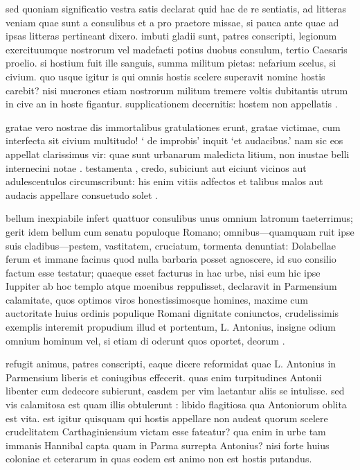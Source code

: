  sed quoniam significatio vestra satis declarat quid hac de re sentiatis, ad litteras veniam quae sunt a consulibus et a pro praetore missae, si pauca ante quae ad ipsas litteras pertineant dixero. imbuti gladii sunt, patres conscripti, legionum exercituumque nostrorum vel madefacti potius duobus consulum, tertio Caesaris proelio. si hostium fuit ille sanguis, summa militum pietas: nefarium scelus, si civium. quo usque igitur is qui omnis hostis scelere superavit nomine hostis carebit? nisi mucrones etiam nostrorum militum tremere voltis dubitantis utrum in cive an in hoste figantur. supplicationem decernitis: hostem non appellatis .

 gratae vero nostrae dis immortalibus gratulationes erunt, gratae victimae, cum interfecta sit civium multitudo! ` de improbis' inquit `et audacibus.' nam sic eos appellat clarissimus vir: quae sunt urbanarum maledicta litium, non inustae belli internecini notae . testamenta , credo, subiciunt aut eiciunt vicinos aut adulescentulos circumscribunt: his enim vitiis adfectos et talibus malos aut audacis appellare consuetudo solet .

 bellum inexpiabile infert quattuor consulibus unus omnium latronum taeterrimus; gerit idem bellum cum senatu populoque Romano; omnibus—quamquam ruit ipse suis cladibus—pestem, vastitatem, cruciatum, tormenta denuntiat: Dolabellae ferum et immane facinus quod nulla barbaria posset agnoscere, id suo consilio factum esse testatur; quaeque esset facturus in hac urbe, nisi eum hic ipse Iuppiter ab hoc templo atque moenibus reppulisset, declaravit in Parmensium calamitate, quos optimos viros honestissimosque homines, maxime cum auctoritate huius ordinis populique Romani dignitate coniunctos, crudelissimis exemplis interemit propudium illud et portentum, L. Antonius, insigne odium omnium hominum vel, si etiam di oderunt quos oportet, deorum .

 refugit animus, patres conscripti, eaque dicere reformidat quae L. Antonius in Parmensium liberis et coniugibus effecerit. quas enim turpitudines Antonii libenter cum dedecore subierunt, easdem per vim laetantur aliis se intulisse. sed vis calamitosa est quam illis obtulerunt : libido flagitiosa qua Antoniorum oblita est vita. est igitur quisquam qui hostis appellare non audeat quorum scelere crudelitatem Carthaginiensium victam esse fateatur? qua enim in urbe tam immanis Hannibal capta quam in Parma surrepta Antonius? nisi forte huius coloniae et ceterarum in quas eodem est animo non est hostis putandus.

